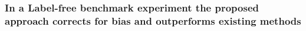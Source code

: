 \documentclass[mcp]{article}
\numberwithin{figure}{section} %
\numberwithin{table}{section}
\def\todo#1{{\color{red}[#1]}}
\begin{document}


\subsubsection*{In a Label-free benchmark experiment the proposed approach corrects for bias and outperforms existing methods}
\end{document}
